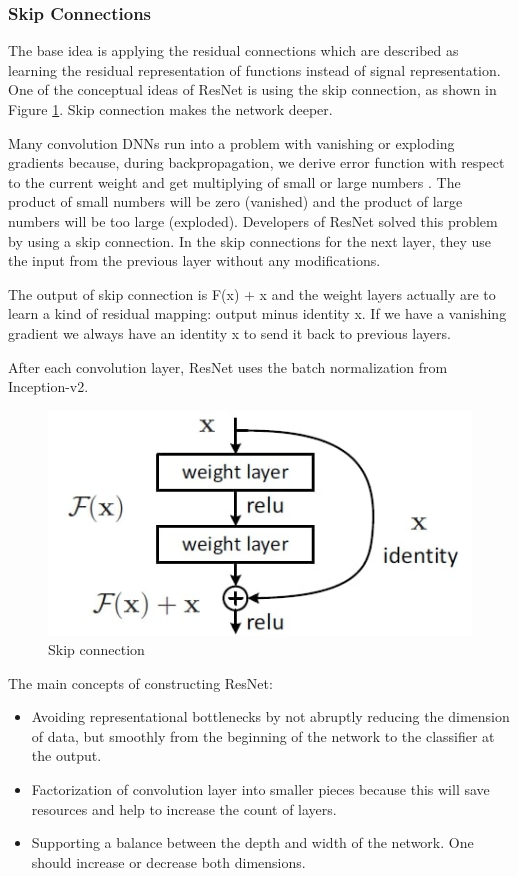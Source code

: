 \subsubsection{Skip Connections}
The base idea is applying the residual connections which are described as learning the residual representation of functions instead of signal representation. One of the conceptual ideas of ResNet is using the skip connection, as shown in Figure \ref{fig:Skip_connection}. Skip connection makes the network deeper.

Many convolution DNNs run into a problem with vanishing or exploding gradients because, during backpropagation, we derive error function with respect to the current weight and get multiplying of small or large numbers \cite{skip_fig}. The product of small numbers will be zero (vanished) and the product of large numbers will be too large (exploded). Developers of ResNet solved this problem by using a skip connection. In the skip connections for the next layer, they use the input from the previous layer without any modifications. 

The output of skip connection is  F(x) + x and the weight layers actually are to learn a kind of residual mapping: output minus identity x. If we have a vanishing gradient we always have an identity x to send it back to previous layers. 

After each convolution layer, ResNet uses the batch normalization from Inception-v2. 

\begin{figure}[h!]
    \centering
    \includegraphics[scale=0.4]{resnet_1}
    \caption{Skip connection \cite{skip_fig}}
    \label{fig:Skip_connection}
\end{figure}

The main concepts of constructing ResNet:
\begin{itemize}
\item Avoiding representational bottlenecks by not abruptly reducing the dimension of data, but smoothly from the beginning of the network to the classifier at the output.
\item Factorization of convolution layer into smaller pieces because this will save resources and help to increase the count of layers.
\item Supporting a balance between the depth and width of the network. One should increase or decrease both dimensions.
\end{itemize}



